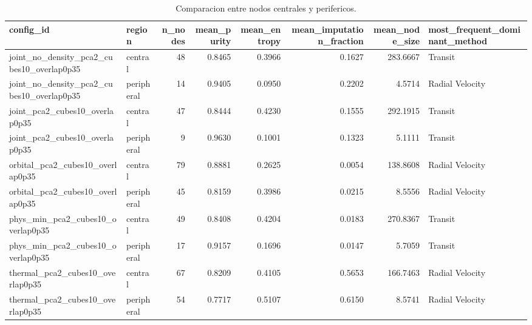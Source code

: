 \begin{table}[ht]
\centering
\caption{Comparacion entre nodos centrales y perifericos.}
\begin{tabular}{llrrrrrl}
\toprule
config\_id & region & n\_nodes & mean\_purity & mean\_entropy & mean\_imputation\_fraction & mean\_node\_size & most\_frequent\_dominant\_method \\
\midrule
joint\_no\_density\_pca2\_cubes10\_overlap0p35 & central & 48 & 0.8465 & 0.3966 & 0.1627 & 283.6667 & Transit \\
joint\_no\_density\_pca2\_cubes10\_overlap0p35 & peripheral & 14 & 0.9405 & 0.0950 & 0.2202 & 4.5714 & Radial Velocity \\
joint\_pca2\_cubes10\_overlap0p35 & central & 47 & 0.8444 & 0.4230 & 0.1555 & 292.1915 & Transit \\
joint\_pca2\_cubes10\_overlap0p35 & peripheral & 9 & 0.9630 & 0.1001 & 0.1323 & 5.1111 & Transit \\
orbital\_pca2\_cubes10\_overlap0p35 & central & 79 & 0.8881 & 0.2625 & 0.0054 & 138.8608 & Radial Velocity \\
orbital\_pca2\_cubes10\_overlap0p35 & peripheral & 45 & 0.8159 & 0.3986 & 0.0215 & 8.5556 & Radial Velocity \\
phys\_min\_pca2\_cubes10\_overlap0p35 & central & 49 & 0.8408 & 0.4204 & 0.0183 & 270.8367 & Transit \\
phys\_min\_pca2\_cubes10\_overlap0p35 & peripheral & 17 & 0.9157 & 0.1696 & 0.0147 & 5.7059 & Transit \\
thermal\_pca2\_cubes10\_overlap0p35 & central & 67 & 0.8209 & 0.4105 & 0.5653 & 166.7463 & Radial Velocity \\
thermal\_pca2\_cubes10\_overlap0p35 & peripheral & 54 & 0.7717 & 0.5107 & 0.6150 & 8.5741 & Radial Velocity \\
\bottomrule
\end{tabular}

\end{table}

